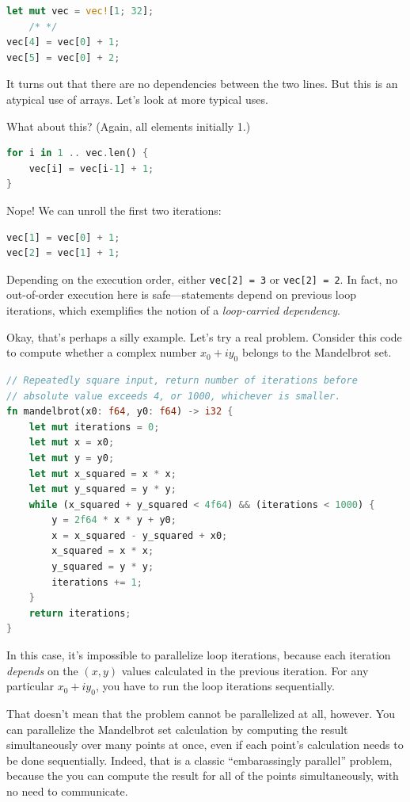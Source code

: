\documentclass[a4paper]{report}
\begin{document}
\begin{lstlisting}[language=Rust]
let mut vec = vec![1; 32];
    /* */
vec[4] = vec[0] + 1;
vec[5] = vec[0] + 2;
\end{lstlisting}


It turns out that there are no dependencies between the two lines. But this is
an atypical use of arrays. Let's look at more typical uses.

What about this? (Again, all elements initially 1.)

\begin{lstlisting}[language=Rust]
for i in 1 .. vec.len() {
    vec[i] = vec[i-1] + 1;
}
\end{lstlisting}

Nope! We can unroll the first two iterations:
\begin{lstlisting}[language=Rust]
vec[1] = vec[0] + 1;
vec[2] = vec[1] + 1;
\end{lstlisting}

Depending on the execution order, either {\tt vec[2] = 3} or {\tt vec[2] =
  2}.  In fact, no out-of-order execution here is safe---statements depend
on previous loop iterations, which exemplifies the notion of a
\emph{loop-carried dependency}. 

Okay, that's perhaps a silly example. 
Let's try a real problem. Consider this code to compute whether a complex number $x_0 + iy_0$ belongs to the Mandelbrot set.

\begin{lstlisting}[language=Rust]
// Repeatedly square input, return number of iterations before
// absolute value exceeds 4, or 1000, whichever is smaller.
fn mandelbrot(x0: f64, y0: f64) -> i32 {
    let mut iterations = 0;
    let mut x = x0;
    let mut y = y0;
    let mut x_squared = x * x;
    let mut y_squared = y * y;
    while (x_squared + y_squared < 4f64) && (iterations < 1000) {
        y = 2f64 * x * y + y0;
        x = x_squared - y_squared + x0;
        x_squared = x * x;
        y_squared = y * y;
        iterations += 1;
    }
    return iterations;
}
\end{lstlisting}
In this case, it's impossible to parallelize loop iterations, because
each iteration \emph{depends} on the $(x, y)$ values calculated in the
previous iteration. For any particular $x_0 + iy_0$, you have to run the
loop iterations sequentially.

That doesn't mean that the problem cannot be parallelized at all, however.
You can parallelize the Mandelbrot set calculation
by computing the result simultaneously over many points at
once, even if each point's calculation needs to be done sequentially.
Indeed, that is a classic ``embarassingly parallel'' problem,
because the you can compute the result for all of the points
simultaneously, with no need to communicate.
\end{document}

